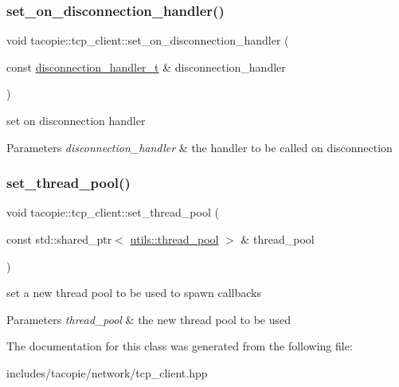 \subsubsection{\texorpdfstring{set\+\_\+on\+\_\+disconnection\+\_\+handler()}{set\_on\_disconnection\_handler()}}
{\footnotesize\ttfamily void tacopie\+::tcp\+\_\+client\+::set\+\_\+on\+\_\+disconnection\+\_\+handler (\begin{DoxyParamCaption}\item[{const \hyperlink{classtacopie_1_1tcp__client_aca5df52e5ee6fa673cf212532ada1453}{disconnection\+\_\+handler\+\_\+t} \&}]{disconnection\+\_\+handler }\end{DoxyParamCaption})}

set on disconnection handler


\begin{DoxyParams}{Parameters}
{\em disconnection\+\_\+handler} & the handler to be called on disconnection \\
\hline
\end{DoxyParams}
\mbox{\label{classtacopie_1_1tcp__client_aa484994fc605cd93c18a496c376f4589}} 
\subsubsection{\texorpdfstring{set\+\_\+thread\+\_\+pool()}{set\_thread\_pool()}}
{\footnotesize\ttfamily void tacopie\+::tcp\+\_\+client\+::set\+\_\+thread\+\_\+pool (\begin{DoxyParamCaption}\item[{const std\+::shared\+\_\+ptr$<$ \hyperlink{classtacopie_1_1utils_1_1thread__pool}{utils\+::thread\+\_\+pool} $>$ \&}]{thread\+\_\+pool }\end{DoxyParamCaption})}

set a new thread pool to be used to spawn callbacks 
\begin{DoxyParams}{Parameters}
{\em thread\+\_\+pool} & the new thread pool to be used \\
\hline
\end{DoxyParams}


The documentation for this class was generated from the following file\+:\begin{DoxyCompactItemize}
\item 
includes/tacopie/network/tcp\+\_\+client.\+hpp\end{DoxyCompactItemize}
